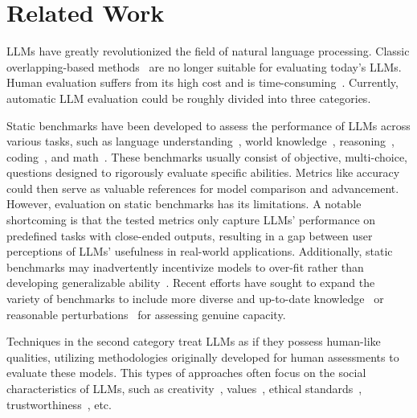 \section{Related Work}
\label{sec:related}

LLMs have greatly revolutionized the field of natural language processing. Classic overlapping-based methods~\cite{PapineniRWZ02Bleu,Lin2004ROUGE} are no longer suitable for evaluating today's LLMs. Human evaluation suffers from its high cost and is time-consuming~\cite{chiang2024chatbotarena}.
Currently, automatic LLM evaluation could be roughly divided into three categories.

Static benchmarks have been developed to assess the performance of LLMs across various tasks, such as language understanding~\cite{hendrycks2021mmlu}, world knowledge~\cite{huang2023ceval,zhong2023agieval}, reasoning~\cite{zellers2019hellaswag}, coding~\cite{chen2021codex}, and math~\cite{hendrycks2021measuring}. 
These benchmarks usually consist of objective, \eg multi-choice, questions designed to rigorously evaluate specific abilities. Metrics like accuracy could then serve as valuable references for model comparison and advancement. 
However, evaluation on static benchmarks has its limitations. A notable shortcoming is that the tested metrics only capture LLMs' performance on predefined tasks with close-ended outputs, resulting in a gap between user perceptions of LLMs' usefulness in real-world applications. 
Additionally, static benchmarks may inadvertently incentivize models to over-fit rather than developing generalizable ability~\cite{zhou2023dontmake,bordt2024elephants}. Recent efforts have sought to expand the variety of benchmarks to include more diverse and up-to-date knowledge~\cite{mousavi2024dyknow} or reasonable perturbations~\cite{li2024perteval} for assessing genuine capacity.

Techniques in the second category treat LLMs as if they possess human-like qualities, utilizing methodologies originally developed for human assessments to evaluate these models. This types of approaches often focus on the social characteristics of LLMs, such as creativity~\cite{zhao2024creativity}, values~\cite{jiang2024llm-value,hendrycks2021ethics,biedma2024humannorms}, ethical standards~\cite{jiang202morality,scherrer2023evaluating}, trustworthiness~\cite{sun2024trustllmtrustworthinesslargelanguage}, etc.


